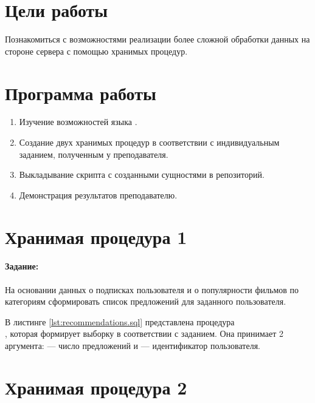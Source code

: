 





\tableofcontents
\newpage

\section{Цели работы}

Познакомиться с возможностями реализации более сложной обработки данных на стороне сервера с помощью хранимых процедур.

\section{Программа работы}

\begin{enumerate}
	\item Изучение возможностей языка .
	\item Создание двух хранимых процедур в соответствии с индивидуальным заданием, полученным у преподавателя.
	\item Выкладывание скрипта с созданными сущностями в репозиторий.
	\item Демонстрация результатов преподавателю.
\end{enumerate}

\section{Хранимая процедура 1}
\paragraph{Задание:} На основании данных о подписках пользователя и о популярности фильмов по категориям сформировать список предложений для заданного пользователя.

В листинге \ref{lst:recommendations.sql} представлена процедура\\ , которая формирует выборку в соответствии с заданием. Она принимает 2 аргумента:  --- число предложений и  --- идентификатор пользователя.



\section{Хранимая процедура 2}
